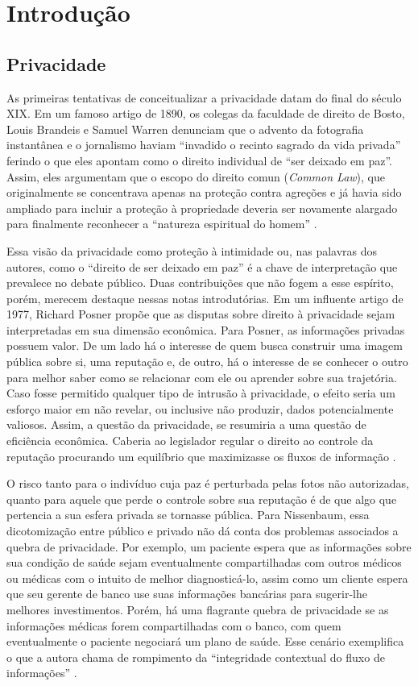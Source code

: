 \chapter{Introdução}

\section{Privacidade}
\label{sec:privacidade}

As primeiras tentativas de conceitualizar a privacidade datam do final do século XIX.
Em um famoso artigo de 1890, os colegas da faculdade de direito de Bosto, Louis Brandeis e Samuel Warren denunciam que o advento da fotografia instantânea e o jornalismo haviam ``invadido o recinto sagrado da vida privada'' ferindo o que eles apontam como o direito individual de ``ser deixado em paz''.
Assim, eles argumentam que o escopo do direito comun ({\em Common Law}), que originalmente se concentrava apenas na proteção contra agreções e já havia sido ampliado para incluir a proteção à propriedade deveria ser novamente alargado para finalmente reconhecer a ``natureza espiritual do homem'' \cite{Warren1890}.

Essa visão da privacidade como proteção à intimidade ou, nas palavras dos autores, como o ``direito de ser deixado em paz'' é a chave de interpretação que prevalece no debate público.
Duas contribuições que não fogem a esse espírito, porém, merecem destaque nessas notas introdutórias.
Em um influente artigo de 1977, Richard Posner propõe que as disputas sobre direito à privacidade sejam interpretadas em sua dimensão econômica.
Para Posner, as informações privadas possuem valor. 
De um lado há o interesse de quem busca construir uma imagem pública sobre si, uma reputação e, de outro, há o interesse de se conhecer o outro para melhor saber como se relacionar com ele ou aprender sobre sua trajetória.
Caso fosse permitido qualquer tipo de intrusão à privacidade, o efeito seria um esforço maior em não revelar, ou inclusive não produzir, dados potencialmente valiosos.
Assim, a questão da privacidade, se resumiria a uma questão de eficiência econômica.
Caberia ao legislador regular o direito ao controle da reputação procurando um equilíbrio que maximizasse os fluxos de informação \cite{Posner77}. 

O risco tanto para o indivíduo cuja paz é  perturbada pelas fotos não autorizadas, quanto para aquele que perde o controle sobre sua reputação é de que algo que pertencia a sua esfera privada se tornasse pública.
Para Nissenbaum, essa dicotomização entre público e privado não dá conta dos problemas associados a quebra de privacidade.
Por exemplo, um paciente espera que as informações sobre sua condição de saúde sejam eventualmente compartilhadas com outros médicos ou médicas com o intuito de melhor diagnosticá-lo, assim como um cliente espera que seu gerente de banco use suas informações bancárias para sugerir-lhe melhores investimentos.
Porém, há uma flagrante quebra de privacidade se as informações médicas forem compartilhadas com o banco, com quem eventualmente o paciente negociará um plano de saúde.
Esse cenário exemplifica o que a autora chama de rompimento da ``integridade contextual do fluxo de informações'' \cite{Nissenbaum09}.

